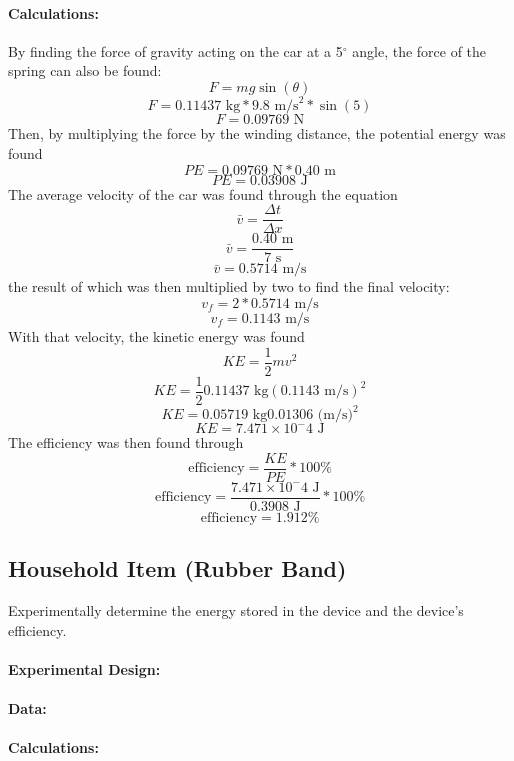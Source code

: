 \documentclass[12pt]{article}
\begin{document}
	\paragraph{Calculations:} By finding the force of gravity acting on the car at a 5$^{\circ}$ angle, the force of the spring can also be found:
	\begin{equation}
		F = mg \sin(\theta)
	\end{equation}
	$$ F = 0.11437 \text{ kg} * 9.8 \text{ m/s}^2 * \sin(5) $$
	$$ F = 0.09769 \text{ N} $$
	Then, by multiplying the force by the winding distance, the potential energy was found
	$$ PE = 0.09769 \text{ N} * 0.40 \text{ m} $$
	$$ PE = 0.03908 \text{ J} $$
	The average velocity of the car was found through the equation
	\begin{equation}
		\bar{v} = \frac{\Delta t}{\Delta x}
	\end{equation}
	$$ \bar{v} = \frac{0.40 \text{ m}}{7 \text{ s}} $$
	$$ \bar{v} = 0.5714 \text{ m/s} $$
	the result of which was then multiplied by two to find the final velocity:
	$$ v_f = 2 * 0.5714 \text{ m/s} $$
	$$ v_f = 0.1143 \text{ m/s} $$
	With that velocity, the kinetic energy was found
	\begin{equation}
		KE = \frac{1}{2}mv^2
	\end{equation}
	$$ KE = \frac{1}{2} 0.11437 \text{ kg} (0.1143 \text{ m/s})^2 $$
	$$ KE = 0.05719 \text{ kg} 0.01306 \text{ (m/s)}^2 $$
	$$ KE = 7.471 \times 10^-4 \text{ J} $$
	The efficiency was then found through
	\begin{equation}
		\text{efficiency} = \frac{KE}{PE}*100\%
	\end{equation}
	$$ \text{efficiency} = \frac{7.471 \times 10^-4 \text{ J}}{0.3908 \text{ J}}*100\% $$
	$$ \text{efficiency} = 1.912\% $$
	
	\subsection{Household Item (Rubber Band)}
	Experimentally determine the energy stored in the device and the device's efficiency.
	\paragraph{Experimental Design:}
	\paragraph{Data:}
	\paragraph{Calculations:}
	
\end{document}
